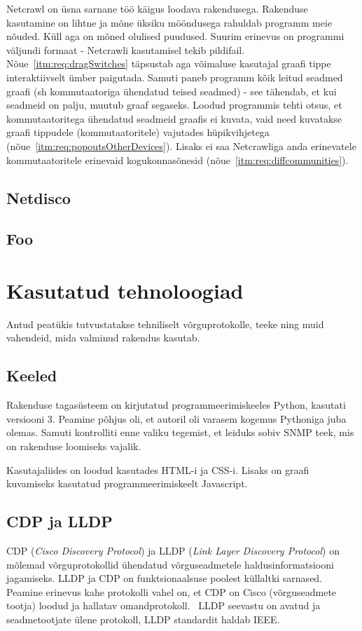 \documentclass[12pt]{article}
\newcommand{\TODO}{\todo[inline]}
\begin{document}
Netcrawl on üsna sarnane töö käigus loodava rakendusega.
Rakenduse kasutamine on lihtne ja mõne üksiku mööndusega rahuldab programm meie nõuded.
Küll aga on mõned olulised puudused.
Suurim erinevus on programmi väljundi formaat - Netcrawli kasutamisel tekib pildifail.
Nõue~\ref{itm:req:dragSwitches} täpsustab aga võimaluse kasutajal graafi tippe interaktiivselt
ümber paigutada.
Samuti paneb programm kõik leitud seadmed graafi (sh kommutaatoriga ühendatud teised seadmed) -
see tähendab, et kui seadmeid on palju, muutub graaf segaseks.
Loodud programmis tehti otsus, et kommutaatoritega ühendatud seadmeid graafis ei kuvata, vaid need
kuvatakse graafi tippudele (kommutaatoritele) vajutades
hüpikvihjetega (nõue~\ref{itm:req:popoutsOtherDevices}).
Lisaks ei saa Netcrawliga anda erinevatele kommutaatoritele erinevaid
kogukonnasõnesid (nõue~\ref{itm:req:diffcommunities}).

\subsection{Netdisco}
\TODO{Netdisco ülevaade}

\subsection{Foo}
\TODO{kolmas sarnane lahendus?}



\newpage
\section{Kasutatud tehnoloogiad} \label{usedTech}
Antud peatükis tutvustatakse tehniliselt võrguprotokolle, teeke ning muid vahendeid, mida valminud
rakendus kasutab.

\subsection{Keeled}
Rakenduse tagasüsteem on kirjutatud programmeerimiskeeles Python, kasutati versiooni 3.
Peamine põhjus oli, et autoril oli varasem kogemus Pythoniga juba olemas.
Samuti kontrolliti enne valiku tegemist, et leiduks sobiv SNMP teek, mis on rakenduse loomiseks
vajalik.

Kasutajaliides on loodud kasutades HTML-i ja CSS-i.
Lisaks on graafi kuvamiseks kasutatud programmeerimiskeelt Javascript.

\subsection{CDP ja LLDP}
CDP (\textit{Cisco Discovery Protocol}) ja LLDP (\textit{Link Layer Discovery Protocol}) on
mõlemad võrguprotokollid ühendatud võrguseadmetele haldusinformatsiooni jagamiseks.
LLDP ja CDP on funktsionaalsuse poolest küllaltki sarnased.
Peamine erinevus kahe protokolli vahel on, et CDP on Cisco (võrguseadmete tootja)
loodud ja hallatav omandprotokoll.~\cite{cdpInfo}
LLDP seevastu on avatud ja seadmetootjate ülene protokoll, LLDP standardit haldab
IEEE.~\cite{lldpInfo}
\end{document}
